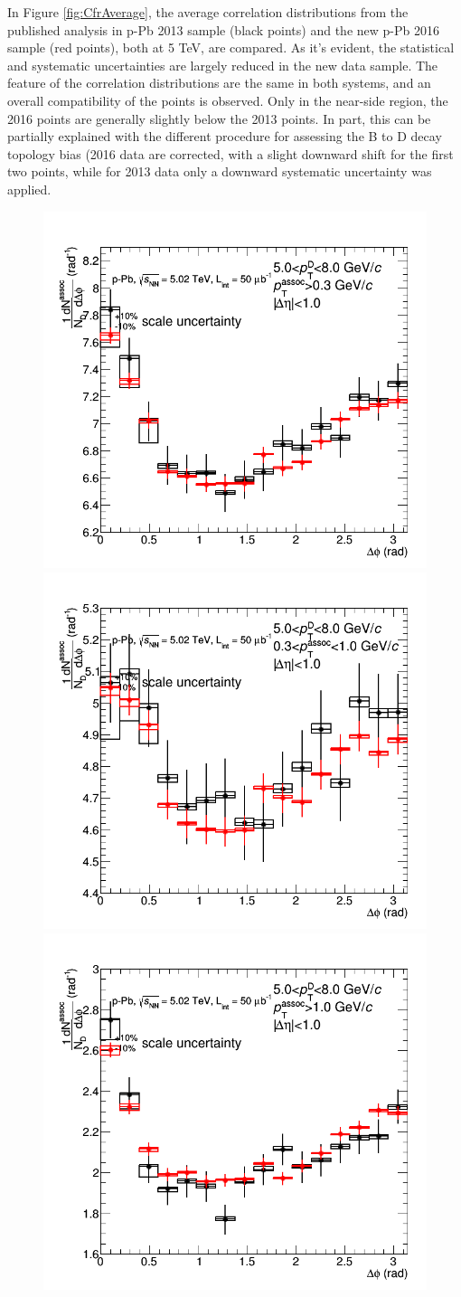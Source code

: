 In Figure \ref{fig:CfrAverage}, the average correlation distributions from the published analysis in p-Pb 2013 sample (black points) and the new p-Pb 2016 sample (red points), both at 5 TeV, are compared. As it's evident, the statistical and systematic uncertainties are largely reduced in the new data sample. The feature of the correlation distributions are the same in both systems, and an overall compatibility of the points is observed. Only in the near-side region, the 2016 points are generally slightly below the 2013 points. In part, this can be partially explained with the different procedure for assessing the B to D decay topology bias (2016 data are corrected, with a slight downward shift for the first two points, while for 2013 data only a downward systematic uncertainty was applied.

\begin{figure}[!htbp]
\centering
\centering
{\includegraphics[width=0.47\linewidth]{figures/Cfr2013vs2016/Average_Cfr_2013_2016_Pt5to8_Thr03to99.png}}
{\includegraphics[width=0.47\linewidth]{figures/Cfr2013vs2016/Average_Cfr_2013_2016_Pt5to8_Thr03to1.png}}
{\includegraphics[width=0.47\linewidth]{figures/Cfr2013vs2016/Average_Cfr_2013_2016_Pt5to8_Thr1to99.png}}

\end{figure}
